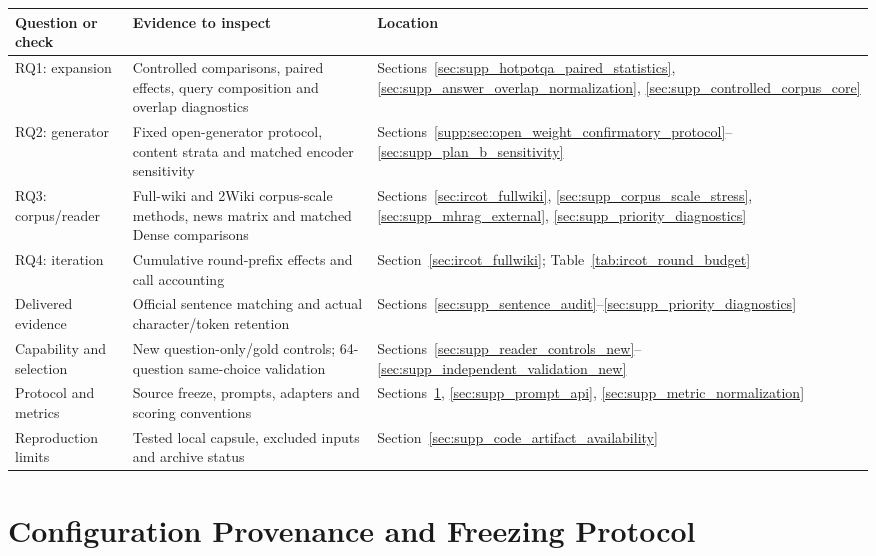 \documentclass[pdflatex,sn-basic,Numbered]{sn-jnl}
\begin{document}
\begin{center}
\small
\begin{tabularx}{\textwidth}{>{\raggedright\arraybackslash}p{} >{\raggedright\arraybackslash}X >{\raggedright\arraybackslash}p{}}
\toprule
Question or check & Evidence to inspect & Location \\
\midrule
RQ1: expansion & Controlled comparisons, paired effects, query composition and overlap diagnostics & Sections~\ref{sec:supp_hotpotqa_paired_statistics}, \ref{sec:supp_answer_overlap_normalization}, \ref{sec:supp_controlled_corpus_core} \\
RQ2: generator & Fixed open-generator protocol, content strata and matched encoder sensitivity & Sections~\ref{supp:sec:open_weight_confirmatory_protocol}--\ref{sec:supp_plan_b_sensitivity} \\
RQ3: corpus/reader & Full-wiki and 2Wiki corpus-scale methods, news matrix and matched Dense comparisons & Sections~\ref{sec:ircot_fullwiki}, \ref{sec:supp_corpus_scale_stress}, \ref{sec:supp_mhrag_external}, \ref{sec:supp_priority_diagnostics} \\
RQ4: iteration & Cumulative round-prefix effects and call accounting & Section~\ref{sec:ircot_fullwiki}; Table~\ref{tab:ircot_round_budget} \\
Delivered evidence & Official sentence matching and actual character/token retention & Sections~\ref{sec:supp_sentence_audit}--\ref{sec:supp_priority_diagnostics} \\
Capability and selection & New question-only/gold controls; 64-question same-choice validation & Sections~\ref{sec:supp_reader_controls_new}--\ref{sec:supp_independent_validation_new} \\
Protocol and metrics & Source freeze, prompts, adapters and scoring conventions & Sections~\ref{sec:supp_configuration_provenance}, \ref{sec:supp_prompt_api}, \ref{sec:supp_metric_normalization} \\
Reproduction limits & Tested local capsule, excluded inputs and archive status & Section~\ref{sec:supp_code_artifact_availability} \\
\bottomrule
\end{tabularx}
\end{center}

\tableofcontents

\clearpage

\section{Configuration Provenance and Freezing Protocol}
\label{sec:supp_configuration_provenance}
\end{document}
